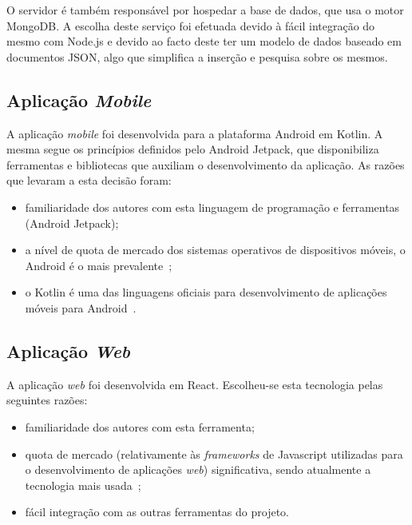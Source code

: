 O servidor é também responsável por hospedar a base de dados, que usa o motor MongoDB. A escolha deste serviço foi efetuada devido à fácil integração do mesmo com Node.js e devido ao facto deste ter um modelo de dados baseado em documentos JSON, algo que simplifica a inserção e pesquisa sobre os mesmos.
\par \medskip

\subsection{Aplicação \textit{Mobile}}
A aplicação \textit{mobile} foi desenvolvida para a plataforma Android em Kotlin. A mesma segue os princípios definidos pelo Android Jetpack, que disponibiliza ferramentas e bibliotecas que auxiliam o desenvolvimento da aplicação. As razões que levaram a esta decisão foram:
\begin{itemize}
	\item familiaridade dos autores com esta linguagem de programação e ferramentas (Android Jetpack);
	\item a nível de quota de mercado dos sistemas operativos de dispositivos móveis, o Android é o mais prevalente~\cite{SCGS2020};
	\item o Kotlin é uma das linguagens oficiais para desenvolvimento de aplicações móveis para Android~\cite{Leiva2017}.
\end{itemize}

\subsection{Aplicação \textit{Web}}
A aplicação \textit{web} foi desenvolvida em React. Escolheu-se esta tecnologia pelas seguintes razões:

\begin{itemize}
	\item familiaridade dos autores com esta ferramenta;
	\item quota de mercado (relativamente às \textit{frameworks} de Javascript utilizadas para o desenvolvimento de aplicações \textit{web}) significativa, sendo atualmente a tecnologia mais usada~\cite{TechMagic2020};
	\item fácil integração com as outras ferramentas do projeto.
\end{itemize}

